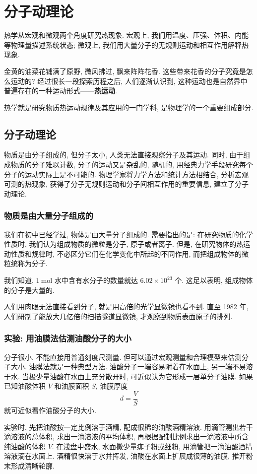 \documentclass[UTF8,openany,fontset=fandol]{ctexbook}
\theoremstyle{chinesetextbook}
\newcommand{\unit}[1]{\ \mathrm{#1}}
\begin{document}
\chapter{分子动理论}
热学从宏观和微观两个角度研究热现象. 宏观上, 我们用温度、压强、体积、内能等物理量描述系统状态; 微观上, 我们用大量分子的无规则运动和相互作用解释热现象.

金黄的油菜花铺满了原野, 微风拂过, 飘来阵阵花香. 这些带来花香的分子究竟是怎么运动的? 经过很长一段探索历程之后, 人们逐渐认识到, 这种运动也是自然界中普遍存在的一种运动形式——\textbf{热运动}.

热学就是研究物质热运动规律及其应用的一门学科, 是物理学的一个重要组成部分.
\section{分子动理论}
物质是由分子组成的, 但分子太小, 人类无法直接观察分子及其运动. 同时, 由于组成物质的分子难以计数, 分子的运动又是杂乱的, 随机的, 用经典力学手段研究每个分子的运动实际上是不可能的. 物理学家将力学方法和统计方法相结合, 分析宏观可测的热现象, 获得了分子无规则运动和分子间相互作用的重要信息, 建立了分子动理论.
\subsection*{物质是由大量分子组成的}
我们在初中已经学过, 物体是由大量分子组成的. 需要指出的是: 在研究物质的化学性质时, 我们认为组成物质的微粒是分子, 原子或者离子. 但是, 在研究物体的热运动性质和规律时, 不必区分它们在化学变化中所起的不同作用, 而把组成物体的微粒统称为分子.

我们知道, $1\unit{mol}$ 水中含有水分子的数量就达 $6.02\times10^{23}$ 个. 这足以表明, 组成物体的分子是大量的.

人们用肉眼无法直接看到分子, 就是用高倍的光学显微镜也看不到. 直至 1982 年, 人们研制了能放大几亿倍的扫描隧道显微镜, 才观察到物质表面原子的排列.
\subsection*{实验: 用油膜法估测油酸分子的大小}
分子很小, 不能直接用普通刻度尺测量. 但可以通过宏观测量和合理模型来估测分子大小. 油膜法就是一种典型方法. 油酸分子一端容易附着在水面上, 另一端不易溶于水. 当极少量油酸在水面上充分散开时, 可近似认为它形成一层单分子油膜. 如果已知油酸体积 $V$ 和油膜面积 $S$, 油膜厚度
\[
d=\frac{V}{S}
\]
就可近似看作油酸分子的大小.

实验时, 先把油酸按一定比例溶于酒精, 配成很稀的油酸酒精溶液. 用滴管测出若干滴溶液的总体积, 求出一滴溶液的平均体积, 再根据配制比例求出一滴溶液中所含纯油酸的体积 $V$. 在浅盘中盛水, 水面撒少量痱子粉或细粉, 用滴管把一滴油酸酒精溶液滴在水面上. 酒精很快溶于水并挥发, 油酸在水面上扩展成很薄的油膜, 推开粉末形成清晰轮廓.
\end{document}
